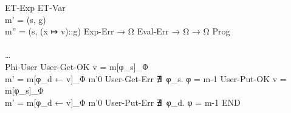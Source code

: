{{    }
    {ET-Exp}{ 
                {}
                {}
            }
    {ET-Var}{ 
                {
               \\ m'  = (s, g)
               \\ m'' = (s, (x ↦ v)::g)
                }
                {}
    }
    {Exp-Err}{ 
                 { }
                 {  → Ω }
    }
    {Eval-Err}{ 
                  {  → Ω }
                  {  → Ω }
    }
    {Prog}{ 
              { 
             \\ 
             \\ …
             \\ 
              }
              {}
    }
    {Phi-User}{ 
                      { }
                      {  }
    }
    {User-Get-OK}{ 
                     { v  = m[φ_s]_Φ
                    \\ m' = m[φ_d ← v]_Φ
                     }
                     { 
                       {m'}{0}
                     }
    }
    {User-Get-Err}{ 
                      {
                        ∄~φ_s. φ = 
                      }
                      { 
                           {m}{-1}
                      }
    }
    {User-Put-OK}{ 
                     { v = m[φ_s]_Φ
                    \\ m' = m[φ_d ← v]_Φ
                     }
                     { 
                         {m'}{0}
                     }
    }
    {User-Put-Err}{ 
                      {
                        ∄~φ_d. φ = 
                      }
                      { 
                           {m}{-1}
                      }
    }
    {END}
}

\def\figctx{
  \begin{align*}
  \gramdef{Contextes}{C}
    { \ctxEmpty }{}
    { \ctxOp{C}{e} }{}
    { \ctxOp{v}{C} }{}
    { \ctxUnOp{C} }{}
    { \&~C }{}
    { \ctxSet{C}{e} }{}
    { \ctxSet{φ}{C} }{}
    { \eStruct{ l_1:v_1 ; … ; l_i:C ; … ; l_n:e_n } }{}
    { \eArray{ v_1 ; … ; C ; … ; e_n } }{}
    { C (e_1, …, e_n) }{}
    { f (v_1, …, C, …, e_n) }{}
    { \ctxLvField{C}{l_S} }{}
    { \ctxLvIndex{C}{e} }{}
    { \ctxLvIndex{φ}{C} }{}
    { *~C }{}
    { C;i }{}
    { \iIf{C}{i_1}{i_2} }{}
    { \iReturn{C} }{}
    { \iDecl{x}{C}{i} }{}
    {END}
  \end{align*}
}


